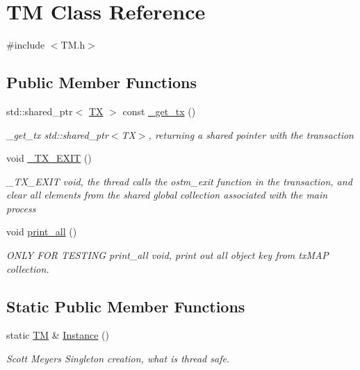 \hypertarget{class_t_m}{}\section{TM Class Reference}
\label{class_t_m}


{\ttfamily \#include $<$T\+M.\+h$>$}

\subsection*{Public Member Functions}
\begin{DoxyCompactItemize}
\item 
std\+::shared\+\_\+ptr$<$ \hyperlink{class_t_x}{TX} $>$ const \hyperlink{class_t_m_a41cb0226cc4080c931651b13f74a0075}{\+\_\+get\+\_\+tx} ()
\begin{DoxyCompactList}\small\item\em \+\_\+get\+\_\+tx std\+::shared\+\_\+ptr$<$\+T\+X$>$, returning a shared pointer with the transaction \end{DoxyCompactList}\item 
void \hyperlink{class_t_m_a5e2d1127f2429f2f524d25f430eade06}{\+\_\+\+T\+X\+\_\+\+E\+X\+IT} ()
\begin{DoxyCompactList}\small\item\em \+\_\+\+T\+X\+\_\+\+E\+X\+IT void, the thread calls the ostm\+\_\+exit function in the transaction, and clear all elements from the shared global collection associated with the main process \end{DoxyCompactList}\item 
void \hyperlink{class_t_m_a1d6891b1d3e71cc0acef54e7afe71c09}{print\+\_\+all} ()
\begin{DoxyCompactList}\small\item\em O\+N\+LY F\+OR T\+E\+S\+T\+I\+NG print\+\_\+all void, print out all object key from tx\+M\+AP collection. \end{DoxyCompactList}\end{DoxyCompactItemize}
\subsection*{Static Public Member Functions}
\begin{DoxyCompactItemize}
\item 
static \hyperlink{class_t_m}{TM} \& \hyperlink{class_t_m_a7ce5f35e0dae76df4fe116cf905bbe60}{Instance} ()
\begin{DoxyCompactList}\small\item\em Scott Meyer\textquotesingle{}s Singleton creation, what is thread safe. \end{DoxyCompactList}\end{DoxyCompactItemize}


